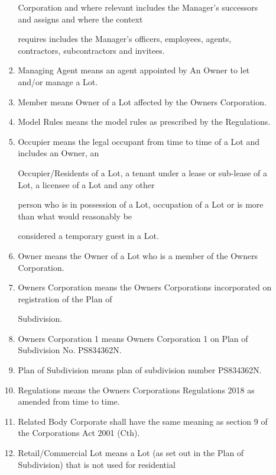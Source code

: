 \documentclass{article}
\begin{document}
\begin{enumerate}[label=\arabic*.]
\begin{enumerate}[label=\arabic{enumi}.\arabic*.]
\begin{enumerate}[label=(\arabic*)]
Corporation and where relevant includes the Manager’s successors and assigns and where the context 

requires includes the Manager’s officers, employees, agents, contractors, subcontractors and invitees. 

\item  Managing Agent means an agent appointed by An Owner to let and/or manage a Lot. 

\newpage

\item  Member means Owner of a Lot affected by the Owners Corporation. 

\item  Model Rules means the model rules as prescribed by the Regulations. 

\item  Occupier means the legal occupant from time to time of a Lot and includes an Owner, an 

Occupier/Residents of a Lot, a tenant under a lease or sub-lease of a Lot, a licensee of a Lot and any other 

person who is in possession of a Lot, occupation of a Lot or is more than what would reasonably be 

considered a temporary guest in a Lot. 

\item  Owner means the Owner of a Lot who is a member of the Owners Corporation. 

\item  Owners Corporation means the Owners Corporations incorporated on registration of the Plan of 

Subdivision. 

\item  Owners Corporation 1 means Owners Corporation 1 on Plan of Subdivision No. PS834362N. 

\item  Plan of Subdivision means plan of subdivision number PS834362N. 

\item  Regulations means the Owners Corporations Regulations 2018 as amended from time to time. 

\item  Related Body Corporate shall have the same meaning as section 9 of the Corporations Act 2001 (Cth). 

\item  Retail/Commercial Lot means a Lot (as set out in the Plan of Subdivision) that is not used for residential 


\end{enumerate}
\end{enumerate}
\end{enumerate}
\end{document}
